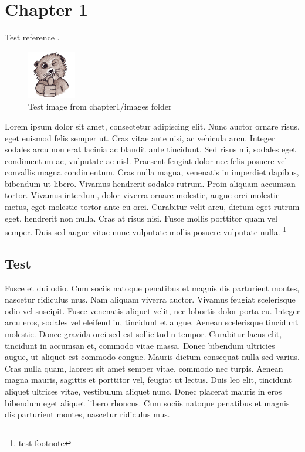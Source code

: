 \chapter{Chapter 1} %

Test reference \cite{thesistpl}.

\begin{figure}[H]
	\begin{center}
		\includegraphics{content/chapter1/images/beaver}
		\caption{Test image from chapter1/images folder}
	\end{center}
\end{figure}

Lorem ipsum dolor sit amet, consectetur adipiscing elit. Nunc auctor ornare risus, eget euismod felis semper ut. Cras vitae ante nisi, ac vehicula arcu. Integer sodales arcu non erat lacinia ac blandit ante tincidunt. Sed risus mi, sodales eget condimentum ac, vulputate ac nisl. Praesent feugiat dolor nec felis posuere vel convallis magna condimentum. Cras nulla magna, venenatis in imperdiet dapibus, bibendum ut libero. Vivamus hendrerit sodales rutrum. Proin aliquam accumsan tortor. Vivamus interdum, dolor viverra ornare molestie, augue orci molestie metus, eget molestie tortor ante eu orci. Curabitur velit arcu, dictum eget rutrum eget, hendrerit non nulla. Cras at risus nisi. Fusce mollis porttitor quam vel semper. Duis sed augue vitae nunc vulputate mollis posuere vulputate nulla. \footnote{test footnote}

\section{Test}

Fusce et dui odio. Cum sociis natoque penatibus et magnis dis parturient montes, nascetur ridiculus mus. Nam aliquam viverra auctor. Vivamus feugiat scelerisque odio vel suscipit. Fusce venenatis aliquet velit, nec lobortis dolor porta eu. Integer arcu eros, sodales vel eleifend in, tincidunt et augue. Aenean scelerisque tincidunt molestie. Donec gravida orci sed est sollicitudin tempor. Curabitur lacus elit, tincidunt in accumsan et, commodo vitae massa. Donec bibendum ultricies augue, ut aliquet est commodo congue. Mauris dictum consequat nulla sed varius. Cras nulla quam, laoreet sit amet semper vitae, commodo nec turpis. Aenean magna mauris, sagittis et porttitor vel, feugiat ut lectus. Duis leo elit, tincidunt aliquet ultrices vitae, vestibulum aliquet nunc. Donec placerat mauris in eros bibendum eget aliquet libero rhoncus. Cum sociis natoque penatibus et magnis dis parturient montes, nascetur ridiculus mus.

